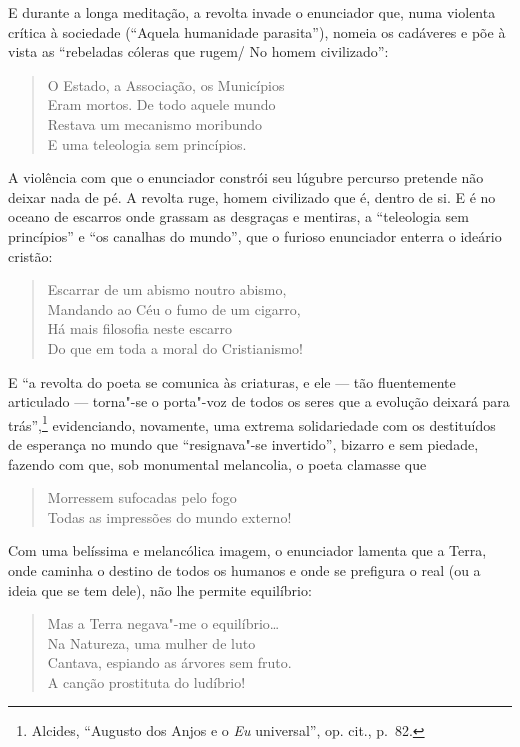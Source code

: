 E durante a longa meditação, a revolta invade o enunciador que, numa
violenta crítica à sociedade (“Aquela humanidade parasita”), nomeia os
cadáveres e põe à vista as “rebeladas cóleras que rugem/ No homem
civilizado”:

\begin{verse}
O Estado, a Associação, os Municípios\\
Eram mortos. De todo aquele mundo\\
Restava um mecanismo moribundo\\
E uma teleologia sem princípios.
\end{verse}

A violência com que o enunciador constrói seu lúgubre percurso
pretende não deixar nada de pé. A revolta ruge, homem civilizado que é,
dentro de si. E é no oceano de escarros onde grassam as desgraças e
mentiras, a “teleologia sem princípios” e “os canalhas do mundo”, que
o furioso enunciador enterra o ideário cristão:

\begin{verse}
Escarrar de um abismo noutro abismo,\\
Mandando ao Céu o fumo de um cigarro,\\
Há mais filosofia neste escarro\\
Do que em toda a moral do Cristianismo!
\end{verse}

E “a revolta do poeta se comunica às criaturas, e ele --- tão
fluentemente articulado --- torna"-se o porta"-voz de todos os seres que a
evolução deixará para trás”,\footnote{Alcides, “Augusto dos Anjos e o \textit{Eu} 
universal”, op. cit., p.~82.} evidenciando,
novamente, uma extrema solidariedade com os destituídos de esperança no
mundo que “resignava"-se invertido”, bizarro e sem piedade, fazendo com
que, sob monumental melancolia, o poeta clamasse que

\begin{verse}
Morressem sufocadas pelo fogo\\
Todas as impressões do mundo externo!
\end{verse}

Com uma belíssima e melancólica imagem, o enunciador lamenta que a
Terra, onde caminha o destino de todos os humanos e onde se prefigura o
real (ou a ideia que se tem dele), não lhe permite equilíbrio:

\begin{verse}
Mas a Terra negava"-me o equilíbrio\ldots{}\\
Na Natureza, uma mulher de luto\\
Cantava, espiando as árvores sem fruto.\\
A canção prostituta do ludíbrio!
\end{verse}

